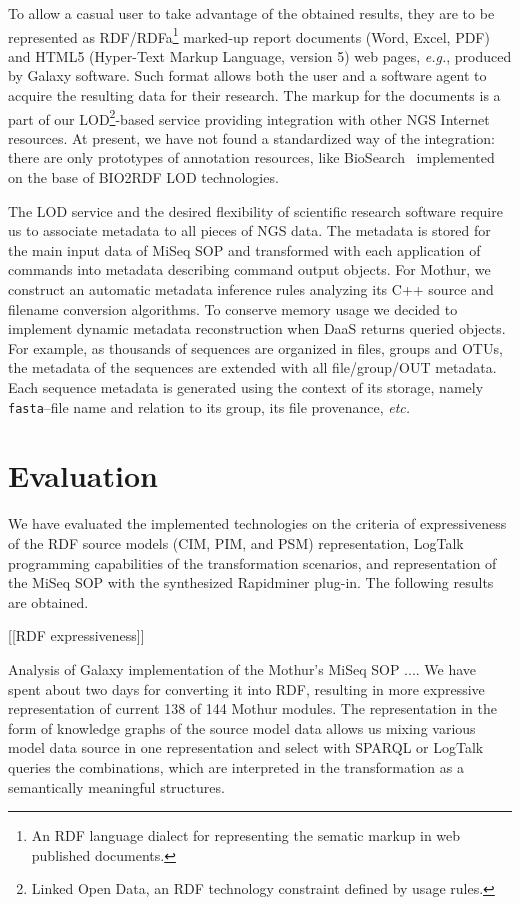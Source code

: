 \documentclass[a4paper]{jpconf}
\begin{document}
To allow a casual user to take advantage of the obtained results, they are to be represented as RDF/RDFa\footnote{An RDF language dialect for representing the sematic markup in web published documents.} marked-up report documents (Word, Excel, PDF) and HTML5 (Hyper-Text Markup Language, version 5) web pages, \emph{e.g.}, produced by Galaxy software.  Such format allows both the user and a software agent to acquire the resulting data for their research.  The markup for the documents is a part of our LOD\footnote{Linked Open Data, an RDF technology constraint defined by usage rules.}-based service providing integration with other NGS Internet resources.  At present, we have not found a standardized way of the integration: there are only prototypes of annotation resources, like BioSearch~\cite{biosearch} implemented on the base of BIO2RDF LOD technologies.

The LOD service and the desired flexibility of scientific research software require us to associate metadata to all pieces of NGS data.  The metadata is stored for the main input data of MiSeq SOP and transformed with each application of commands into metadata describing command output objects.  For Mothur, we construct an automatic metadata inference rules analyzing its C++ source and filename conversion algorithms.  To conserve memory usage we decided to implement dynamic metadata reconstruction when DaaS returns queried objects.  For example, as thousands of sequences are organized in files, groups and OTUs, the metadata of the sequences are extended with all file/group/OUT metadata. Each sequence metadata is generated using the context of its storage, namely \verb|fasta|--file name and relation to its group, its file provenance, \emph{etc.}

\section{Evaluation}\label{sec:eval}

We have evaluated the implemented technologies on the criteria of expressiveness of the RDF source models (CIM, PIM, and PSM) representation, LogTalk programming capabilities of the transformation scenarios, and
representation of the MiSeq SOP with the synthesized Rapidminer plug-in. The following results are obtained.

[[RDF expressiveness]]

Analysis of Galaxy implementation of the Mothur's MiSeq SOP .... We have spent about two days for converting it into RDF, resulting in more expressive representation of current 138 of 144 Mothur modules.  The representation in the form of knowledge graphs of the source model data allows us mixing various model data source in one representation and select with SPARQL or LogTalk queries the combinations, which are interpreted in the transformation as a semantically meaningful structures.  %
\end{document}
